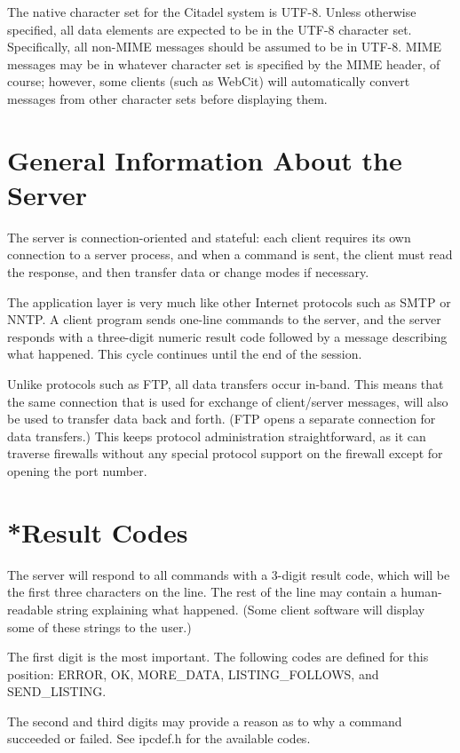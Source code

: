  The native character set for the Citadel system is UTF-8.  Unless otherwise
specified, all data elements are expected to be in the UTF-8 character set.
Specifically, all non-MIME messages should be assumed to be in UTF-8.  MIME
messages may be in whatever character set is specified by the MIME header, of
course; however, some clients (such as WebCit) will automatically convert
messages from other character sets before displaying them.


\section{General Information About the Server}

 The server is connection-oriented and stateful: each client requires its own
connection to a server process, and when a command is sent, the client must
read the response, and then transfer data or change modes if necessary.

 The application layer is very much like other Internet protocols such as SMTP
or NNTP.  A client program sends one-line commands to the server, and the
server responds with a three-digit numeric result code followed by a message
describing what happened.  This cycle continues until the end of the
session.

 Unlike protocols such as FTP, all data transfers occur in-band.  This means
that the same connection that is used for exchange of client/server
messages, will also be used to transfer data back and forth.  (FTP opens a
separate connection for data transfers.)  This keeps protocol administration
straightforward, as it can traverse firewalls without any special protocol
support on the firewall except for opening the port number.


\section{*Result Codes}

 The server will respond to all commands with a 3-digit result code, which
will be the first three characters on the line.  The rest of the line may
contain a human-readable string explaining what happened.  (Some client
software will display some of these strings to the user.)

 The first digit is the most important.  The following codes are defined for
this position: ERROR, OK, MORE_DATA, LISTING_FOLLOWS, and SEND_LISTING.

 The second and third digits may provide a reason as to why a command
succeeded or failed.  See ipcdef.h for the available codes.


